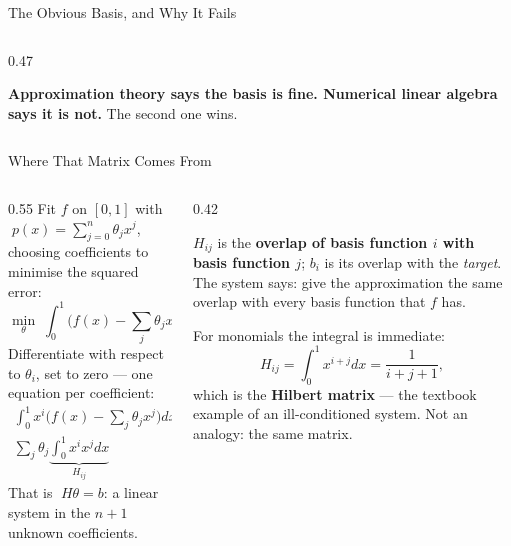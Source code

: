 \begin{frame}{The Obvious Basis, and Why It Fails}
\begin{columns}[T]
\begin{column}{0.47\textwidth}
\begin{center}
\end{center}
\vspace{-2mm}
\begin{takeawaybox}\footnotesize
\textbf{Approximation theory says the basis is fine. Numerical linear algebra says it is not.} The second one wins.
\end{takeawaybox}
\end{column}
\end{columns}
\vspace{1mm}
\end{frame}

\begin{frame}{Where That Matrix Comes From}
\begin{columns}[T]
\begin{column}{0.55\textwidth}
\small
Fit $f$ on $[0,1]$ with $\;p(x)=\sum_{j=0}^{n}\theta_j x^{j}$, choosing coefficients to minimise the
squared error:
\[
  \min_{\theta}\;\int_0^1\Big(f(x)-\sum_{j}\theta_j x^{j}\Big)^{2}dx .
\]
Differentiate with respect to $\theta_i$, set to zero --- one equation per coefficient:
\begin{align*}
  \int_0^1 x^{i}\Big(f(x)-\sum_{j}\theta_j x^{j}\Big)dx &= 0\\[1mm]
  \sum_{j}\theta_j\underbrace{\int_0^1 x^{i}x^{j}dx}_{\textstyle H_{ij}}
   &= \underbrace{\int_0^1 x^{i}f(x)\,dx}_{\textstyle b_i}
\end{align*}
That is $\;H\theta=b$: a linear system in the $n+1$ unknown coefficients.
\end{column}
\begin{column}{0.42\textwidth}
\begin{conceptbox}[title=\textbf{What $H$ and $b$ hold}]\footnotesize
$H_{ij}$ is the \textbf{overlap of basis function $i$ with basis function $j$}; $b_i$ is its overlap
with the \emph{target}. The system says: give the approximation the same overlap with every basis
function that $f$ has.
\end{conceptbox}
\medskip
\begin{examplebox}\footnotesize
For monomials the integral is immediate:
\[
  H_{ij}=\int_0^1 x^{i+j}dx=\frac{1}{i+j+1},
\]
which is the \textbf{Hilbert matrix} --- the textbook example of an ill-conditioned system. Not an
analogy: the same matrix.
\end{examplebox}
\end{column}
\end{columns}
\vspace{1mm}
\end{frame}

